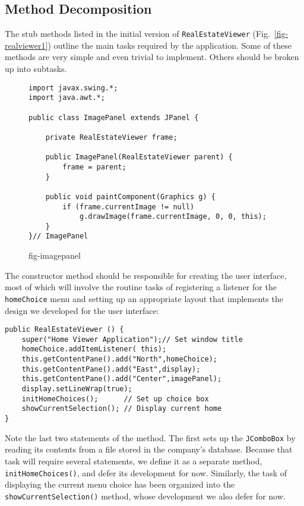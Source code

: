 \subsection*{Method Decomposition}
\noindent The stub methods listed in the initial version of
{\tt RealEstateViewer} (Fig.~\ref{fig-realviewer1}) outline the main
tasks required by the application.  Some of these methods are very
simple and even trivial to implement.  Others should be broken up into
subtasks.


\begin{figure}[tb]
\jjjprogstart
\begin{jjjlisting}
\begin{lstlisting}
import javax.swing.*;
import java.awt.*;

public class ImagePanel extends JPanel {

    private RealEstateViewer frame;

    public ImagePanel(RealEstateViewer parent) {
        frame = parent;
    }

    public void paintComponent(Graphics g) {
        if (frame.currentImage != null)
            g.drawImage(frame.currentImage, 0, 0, this);
    }
}// ImagePanel
\end{lstlisting}
\end{jjjlisting}
{fig-imagepanel}
\end{figure}

The constructor method should be responsible for creating the user
interface, most of which will involve the routine tasks of registering
a listener for the {\tt homeChoice} menu and setting up an appropriate
layout that implements the design we developed for the user interface:

\begin{jjjlisting}
\begin{lstlisting}
public RealEstateViewer () {
    super("Home Viewer Application");// Set window title
    homeChoice.addItemListener( this);
    this.getContentPane().add("North",homeChoice);
    this.getContentPane().add("East",display);
    this.getContentPane().add("Center",imagePanel);
    display.setLineWrap(true);
    initHomeChoices();      // Set up choice box
    showCurrentSelection(); // Display current home
}
\end{lstlisting}
\end{jjjlisting}

\noindent Note the last two statements of the method.
The first sets up the {\tt JComboBox} by reading its contents from a file
stored in the company's database.  Because that task will require
several statements, we define it as a separate method,
{\tt initHomeChoices()}, and defer its development for now.  Similarly,
the task of displaying the current menu choice has been organized
into the {\tt showCurrentSelection()} method, whose development
we also defer for now.

